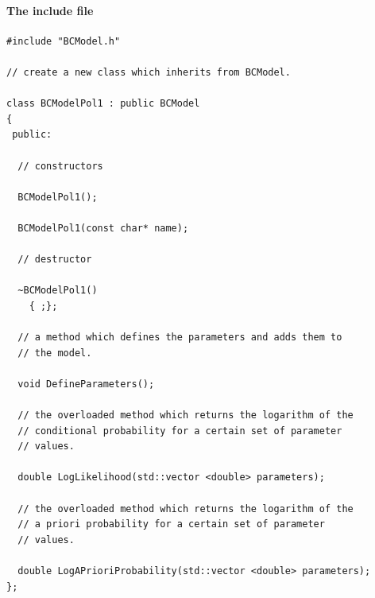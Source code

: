 \documentclass[11pt, a4paper]{article}
\begin{document}
\pagebreak 

\paragraph{The include file} 
% 
\begin{small} 
\begin{verbatim}
#include "BCModel.h" 

// create a new class which inherits from BCModel. 

class BCModelPol1 : public BCModel 
{
 public: 

  // constructors 

  BCModelPol1(); 

  BCModelPol1(const char* name); 

  // destructor 

  ~BCModelPol1()
    { ;};  

  // a method which defines the parameters and adds them to 
  // the model. 

  void DefineParameters(); 

  // the overloaded method which returns the logarithm of the 
  // conditional probability for a certain set of parameter 
  // values. 

  double LogLikelihood(std::vector <double> parameters); 

  // the overloaded method which returns the logarithm of the 
  // a priori probability for a certain set of parameter 
  // values. 

  double LogAPrioriProbability(std::vector <double> parameters); 
}; 
\end{verbatim} 
\end{small} 

\pagebreak 
\end{document}
